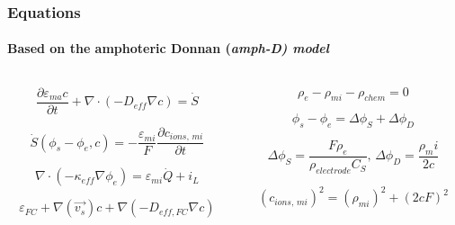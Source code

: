 \begin{frame}
  \frametitle{Equations}
  \framesubtitle{Based on the amphoteric Donnan (\it{amph-D}) model}
  \begin{columns}
    \begin{column}{0.5\textwidth}
      \[
      \frac{\partial \varepsilon_{ma} c}{\partial t}
      + \nabla \cdot \left( - D_{eff} \nabla{c}  \right)
      = \dot{S}
      \]

      \[
      \dot{S}(\phi_s - \phi_e, c) = - \frac{\varepsilon_{mi}}{F}
      \frac{\partial c_{ions,\,mi}}{\partial t}
      \]

      \[
      \nabla \cdot (- \kappa_{eff} \nabla \phi_e) = \varepsilon_{mi} \dot{Q} + i_L
      \]

      \[
      \varepsilon_{FC} + \nabla{(\vec{v_s}) c}
      + \nabla{(- D_{eff,FC} \nabla{c})}
      \]
    \end{column}

    \begin{column}{0.5\textwidth}  %

      \[
      \rho_e - \rho_{mi} - \rho_{chem} = 0
      \]

      \[
      \phi_s - \phi_e = \Delta \phi_S + \Delta \phi_D
      \]

      \[
      \Delta \phi_S = \frac{F \rho_e}{\rho_{electrode} C_S}, \,
      \Delta \phi_D = \frac{\rho_mi}{2c}
      \]

      \[
      (c_{ions,\,mi})^2 = (\rho_{mi})^2 + (2 c F)^2
      \]
    \end{column}
  \end{columns}
\end{frame}

